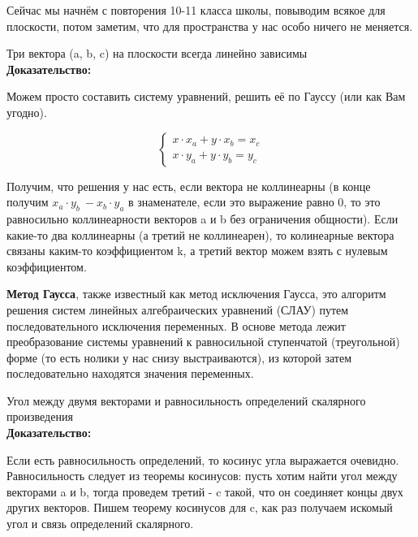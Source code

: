 \documentclass[12pt]{article}
\begin{document}
Сейчас мы начнём с повторения 10-11 класса школы, повыводим всякое для плоскости, потом заметим, что для пространства у нас особо ничего не меняется.\\

\begin{theorembox}
Три вектора (a, b, c) на плоскости всегда линейно зависимы\\

\textbf{Доказательство:}

Можем просто составить систему уравнений, решить её по Гауссу (или как Вам угодно).

\[
\begin{cases}
x \cdot x_a + y \cdot x_b = x_c \\
x \cdot y_a + y \cdot y_b = y_c
\end{cases}
\]

Получим, что решения у нас есть, если вектора не коллинеарны (в конце получим $x_a \cdot y_b \ - x_b \cdot y_a$ в знаменателе, если это выражение равно 0, то это равносильно коллинеарности векторов a и b без ограничения общности). Если какие-то два коллинеарны (а третий не коллинеарен), то колинеарные вектора связаны каким-то коэффициентом k, а третий вектор можем взять с нулевым коэффициентом.
\end{theorembox}

\begin{definitionbox}
    \textbf{Метод Гаусса}, также известный как метод исключения Гаусса, это алгоритм решения систем линейных алгебраических уравнений (СЛАУ) путем последовательного исключения переменных. В основе метода лежит преобразование системы уравнений к равносильной ступенчатой (треугольной) форме (то есть нолики у нас снизу выстраиваются), из которой затем последовательно находятся значения переменных. 
\end{definitionbox}

\begin{theorembox}
Угол между двумя векторами и равносильность определений скалярного произведения\\

\textbf{Доказательство:}

Если есть равносильность определений, то косинус угла выражается очевидно. Равносильность следует из теоремы косинусов: пусть хотим найти угол между векторами a и b, тогда проведем третий - c такой, что он соединяет концы двух других векторов. Пишем теорему косинусов для c, как раз получаем искомый угол и связь определений скалярного.
\end{theorembox}
\end{document}
